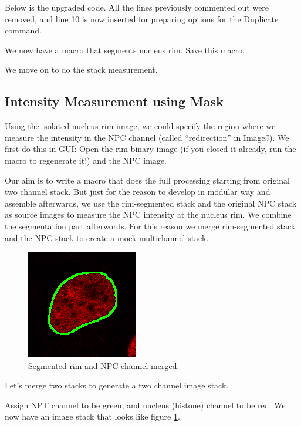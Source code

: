 Below is the upgraded code. All the lines previously commented out were removed, and line 10 is now inserted for preparing options for the Duplicate command. 



We now have a macro that segments nucleus rim. Save this macro.

We move on to do the stack measurement. 

\subsection{Intensity Measurement using Mask}

Using the isolated nucleus rim image, we could specify the region where we measure the intensity in the NPC channel (called ``redirection'' in ImageJ). We first do this in GUI: Open the rim binary image (if you closed it already, run the macro to regenerate it!) and the NPC image. 

Our aim is to write a macro that does the full processing starting from original two channel stack. But just for the reason to develop in modular way and assemble afterwards, we use the rim-segmented stack and the original NPC stack as source images to measure the NPC intensity at the nucleus rim. We combine the segmentation part afterwords. For this reason we merge rim-segmented stack and the NPC stack to create a mock-multichannel stack.  

\begin{figure}[h!]
\begin{center}
\includegraphics[scale=1.0]{fig/NucRimMerged.png}
\caption{Segmented rim and NPC channel merged.}
\label{fig:NucRimMerged}
\end{center}
\end{figure}

Let's merge two stacks to generate a two channel image stack. 


Assign NPT channel to be green, and nucleus (histone) channel to be red. We now have an image stack that looks like figure \ref{fig:NucRimMerged}.

